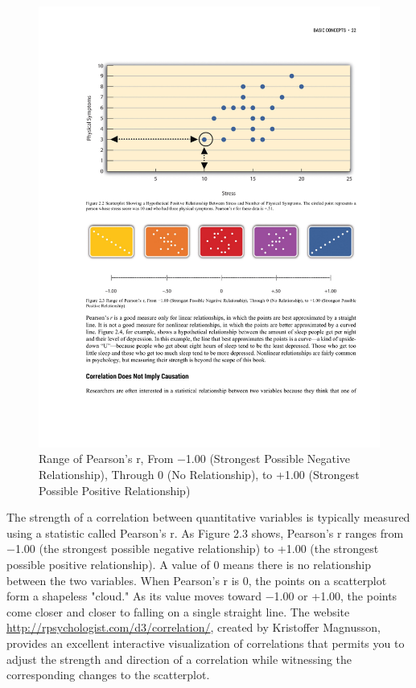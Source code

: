  \begin{figure}
       \includegraphics[width=\linewidth]{figures/C2F4Correlation2.pdf}
       \caption{Range of Pearson’s r, From −1.00 (Strongest Possible Negative Relationship), Through 0 (No Relationship), to +1.00 (Strongest Possible Positive Relationship)}
       \label{fig:Correlation2}
 \end{figure}
 
The strength of a correlation between quantitative variables is typically measured using a statistic called Pearson's r. As Figure 2.3 shows, Pearson's r ranges from −1.00 (the strongest possible negative relationship) to +1.00 (the strongest possible positive relationship). A value of 0 means there is no relationship between the two variables. When Pearson's r is 0, the points on a scatterplot form a shapeless "cloud." As its value moves toward −1.00 or +1.00, the points come closer and closer to falling on a single straight line. The website \url{http://rpsychologist.com/d3/correlation/}, created by Kristoffer Magnusson, provides an excellent interactive visualization of correlations that permits you to adjust the strength and direction of a correlation while witnessing the corresponding changes to the scatterplot.

